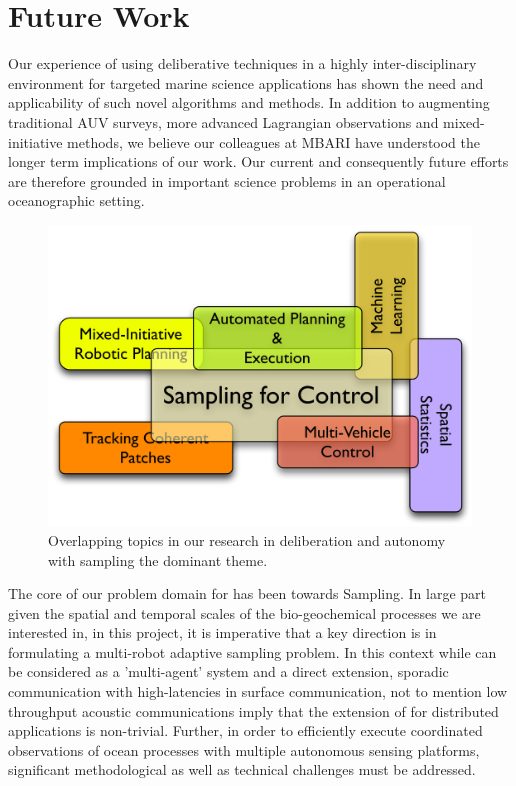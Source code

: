 \section{Future Work}
\label{sec:future}

Our experience of using deliberative techniques in a highly
inter-disciplinary environment for targeted marine science
applications has shown the need and applicability of such novel
algorithms and methods. In addition to augmenting traditional AUV
surveys, more advanced Lagrangian observations and mixed-initiative
methods, we believe our colleagues at MBARI have understood the longer
term implications of our work. Our current and consequently future
efforts are therefore grounded in important science problems in an
operational oceanographic setting.

\begin{figure}[h]
  \centering
  \includegraphics[scale=0.45]{figs/autonomy-topics.jpeg}
  \caption{\small Overlapping topics in our research in deliberation
    and autonomy with sampling the dominant theme.}
  \label{fig:topics}
\end{figure}

The core of our problem domain for \can has been towards Sampling. In
large part given the spatial and temporal scales of the
bio-geochemical processes we are interested in, in this project, it is
imperative that a key direction is in formulating a multi-robot
adaptive sampling problem. In this context while \rx can be considered
as a 'multi-agent' system and  a direct extension, sporadic
communication with high-latencies in surface communication, not to
mention low throughput acoustic communications imply that the
extension of \rx for distributed applications is non-trivial. Further,
in order to efficiently execute coordinated observations of ocean
processes with multiple autonomous sensing platforms, significant
methodological as well as technical challenges must be
addressed. 

